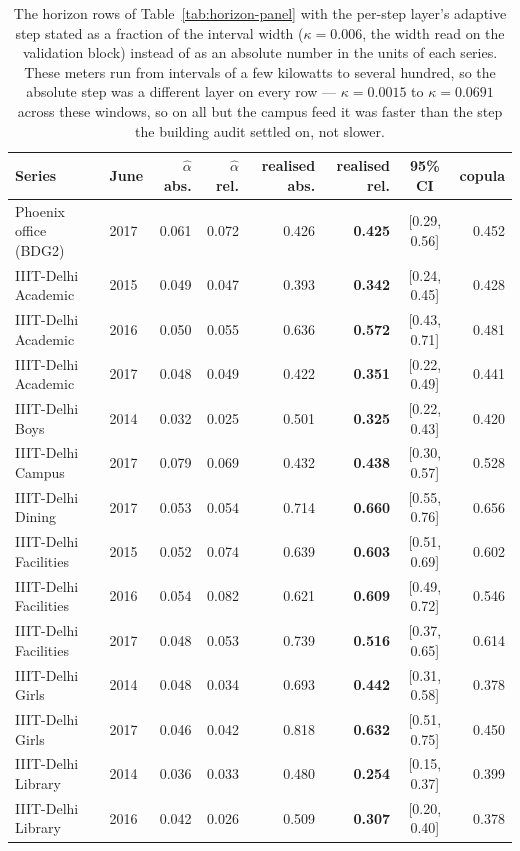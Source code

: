 \begin{table}[t]
\centering
\scriptsize
\setlength{\tabcolsep}{3pt}
\begin{tabular}{llrrrrcr}
\toprule
Series & June & $\hat\alpha$ abs. & $\hat\alpha$ rel. & realised abs. & realised rel. & 95\% CI & copula \\
\midrule
Phoenix office (BDG2) & 2017 & 0.061 & 0.072 & 0.426 & \textbf{0.425} & [0.29, 0.56] & 0.452 \\
\midrule
IIIT-Delhi Academic & 2015 & 0.049 & 0.047 & 0.393 & \textbf{0.342} & [0.24, 0.45] & 0.428 \\
IIIT-Delhi Academic & 2016 & 0.050 & 0.055 & 0.636 & \textbf{0.572} & [0.43, 0.71] & 0.481 \\
IIIT-Delhi Academic & 2017 & 0.048 & 0.049 & 0.422 & \textbf{0.351} & [0.22, 0.49] & 0.441 \\
IIIT-Delhi Boys & 2014 & 0.032 & 0.025 & 0.501 & \textbf{0.325} & [0.22, 0.43] & 0.420 \\
IIIT-Delhi Campus & 2017 & 0.079 & 0.069 & 0.432 & \textbf{0.438} & [0.30, 0.57] & 0.528 \\
IIIT-Delhi Dining & 2017 & 0.053 & 0.054 & 0.714 & \textbf{0.660} & [0.55, 0.76] & 0.656 \\
IIIT-Delhi Facilities & 2015 & 0.052 & 0.074 & 0.639 & \textbf{0.603} & [0.51, 0.69] & 0.602 \\
IIIT-Delhi Facilities & 2016 & 0.054 & 0.082 & 0.621 & \textbf{0.609} & [0.49, 0.72] & 0.546 \\
IIIT-Delhi Facilities & 2017 & 0.048 & 0.053 & 0.739 & \textbf{0.516} & [0.37, 0.65] & 0.614 \\
IIIT-Delhi Girls & 2014 & 0.048 & 0.034 & 0.693 & \textbf{0.442} & [0.31, 0.58] & 0.378 \\
IIIT-Delhi Girls & 2017 & 0.046 & 0.042 & 0.818 & \textbf{0.632} & [0.51, 0.75] & 0.450 \\
IIIT-Delhi Library & 2014 & 0.036 & 0.033 & 0.480 & \textbf{0.254} & [0.15, 0.37] & 0.399 \\
IIIT-Delhi Library & 2016 & 0.042 & 0.026 & 0.509 & \textbf{0.307} & [0.20, 0.40] & 0.378 \\
\bottomrule
\end{tabular}
\caption{The horizon rows of Table~\ref{tab:horizon-panel} with the per-step layer's adaptive step stated as a fraction of the interval width ($\kappa=0.006$, the width read on the validation block) instead of as an absolute number in the units of each series. These meters run from intervals of a few kilowatts to several hundred, so the absolute step was a different layer on every row --- $\kappa=0.0015$ to $\kappa=0.0691$ across these windows, so on all but the campus feed it was faster than the step the building audit settled on, not slower.}
\label{tab:horizon-kappa}
\end{table}
